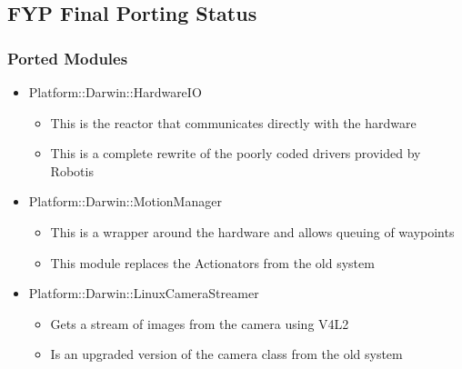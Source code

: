 \documentclass{beamer}
\begin{document}
\subsection{FYP Final Porting Status}
\begin{frame}
	\frametitle{Ported Modules}
	\begin{itemize}
		\item Platform::Darwin::HardwareIO
			\begin{itemize}
				\item This is the reactor that communicates directly with the hardware
				\item This is a complete rewrite of the poorly coded drivers provided by Robotis
			\end{itemize}
		
		\item Platform::Darwin::MotionManager
			\begin{itemize}
				\item This is a wrapper around the hardware and allows queuing of waypoints
				\item This module replaces the Actionators from the old system
			\end{itemize}
		
		\item Platform::Darwin::LinuxCameraStreamer
			\begin{itemize}
				\item Gets a stream of images from the camera using V4L2
				\item Is an upgraded version of the camera class from the old system
			\end{itemize}
		\end{itemize}
\end{frame}
\end{document}
